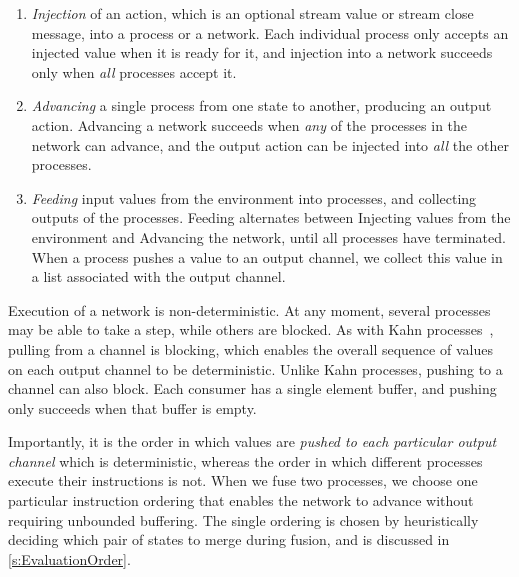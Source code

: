 \begin{enumerate}
\item \emph{Injection} of an action, which is an optional stream value or stream close message, into a process or a network.
  Each individual process only accepts an injected value when it is ready for it, and injection into a network succeeds only when \emph{all} processes accept it.

\item \emph{Advancing} a single process from one state to another, producing an output action.
  Advancing a network succeeds when \emph{any} of the processes in the network can advance, and the output action can be injected into \emph{all} the other processes.

\item \emph{Feeding} input values from the environment into processes, and collecting outputs of the processes.
  Feeding alternates between Injecting values from the environment and Advancing the network, until all processes have terminated.
    When a process pushes a value to an output channel, we collect this value in a list associated with the output channel.
\end{enumerate}

Execution of a network is non-deterministic.
At any moment, several processes may be able to take a step, while others are blocked.
As with Kahn processes~\cite{kahn1976coroutines}, pulling from a channel is blocking, which enables the overall sequence of values on each output channel to be deterministic.
Unlike Kahn processes, pushing to a channel can also block.
Each consumer has a single element buffer, and pushing only succeeds when that buffer is empty.


Importantly, it is the order in which values are \emph{pushed to each particular output channel} which is deterministic, whereas the order in which different processes execute their instructions is not.
When we fuse two processes, we choose one particular instruction ordering that enables the network to advance without requiring unbounded buffering.
The single ordering is chosen by heuristically deciding which pair of states to merge during fusion, and is discussed in \cref{s:EvaluationOrder}.


